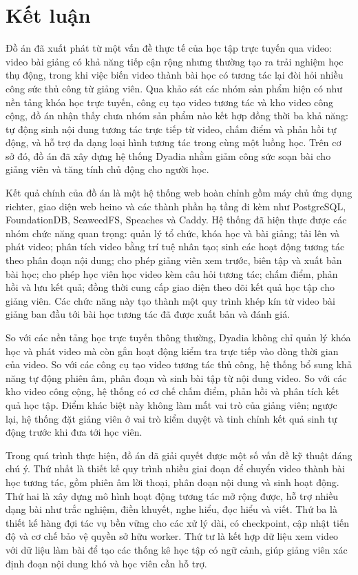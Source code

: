 \documentclass[../DoAn.tex]{subfiles}
\begin{document}
\section{Kết luận}
Đồ án đã xuất phát từ một vấn đề thực tế của học tập trực tuyến qua video: video bài giảng có khả năng tiếp cận rộng nhưng thường tạo ra trải nghiệm học thụ động, trong khi việc biến video thành bài học có tương tác lại đòi hỏi nhiều công sức thủ công từ giảng viên. Qua khảo sát các nhóm sản phẩm hiện có như nền tảng khóa học trực tuyến, công cụ tạo video tương tác và kho video công cộng, đồ án nhận thấy chưa nhóm sản phẩm nào kết hợp đồng thời ba khả năng: tự động sinh nội dung tương tác trực tiếp từ video, chấm điểm và phản hồi tự động, và hỗ trợ đa dạng loại hình tương tác trong cùng một luồng học. Trên cơ sở đó, đồ án đã xây dựng hệ thống Dyadia nhằm giảm công sức soạn bài cho giảng viên và tăng tính chủ động cho người học.

Kết quả chính của đồ án là một hệ thống web hoàn chỉnh gồm máy chủ ứng dụng richter, giao diện web heino và các thành phần hạ tầng đi kèm như PostgreSQL, FoundationDB, SeaweedFS, Speaches và Caddy. Hệ thống đã hiện thực được các nhóm chức năng quan trọng: quản lý tổ chức, khóa học và bài giảng; tải lên và phát video; phân tích video bằng trí tuệ nhân tạo; sinh các hoạt động tương tác theo phân đoạn nội dung; cho phép giảng viên xem trước, biên tập và xuất bản bài học; cho phép học viên học video kèm câu hỏi tương tác; chấm điểm, phản hồi và lưu kết quả; đồng thời cung cấp giao diện theo dõi kết quả học tập cho giảng viên. Các chức năng này tạo thành một quy trình khép kín từ video bài giảng ban đầu tới bài học tương tác đã được xuất bản và đánh giá.

So với các nền tảng học trực tuyến thông thường, Dyadia không chỉ quản lý khóa học và phát video mà còn gắn hoạt động kiểm tra trực tiếp vào dòng thời gian của video. So với các công cụ tạo video tương tác thủ công, hệ thống bổ sung khả năng tự động phiên âm, phân đoạn và sinh bài tập từ nội dung video. So với các kho video công cộng, hệ thống có cơ chế chấm điểm, phản hồi và phân tích kết quả học tập. Điểm khác biệt này không làm mất vai trò của giảng viên; ngược lại, hệ thống đặt giảng viên ở vai trò kiểm duyệt và tinh chỉnh kết quả sinh tự động trước khi đưa tới học viên.

Trong quá trình thực hiện, đồ án đã giải quyết được một số vấn đề kỹ thuật đáng chú ý. Thứ nhất là thiết kế quy trình nhiều giai đoạn để chuyển video thành bài học tương tác, gồm phiên âm lời thoại, phân đoạn nội dung và sinh hoạt động. Thứ hai là xây dựng mô hình hoạt động tương tác mở rộng được, hỗ trợ nhiều dạng bài như trắc nghiệm, điền khuyết, nghe hiểu, đọc hiểu và viết. Thứ ba là thiết kế hàng đợi tác vụ bền vững cho các xử lý dài, có checkpoint, cập nhật tiến độ và cơ chế bảo vệ quyền sở hữu worker. Thứ tư là kết hợp dữ liệu xem video với dữ liệu làm bài để tạo các thống kê học tập có ngữ cảnh, giúp giảng viên xác định đoạn nội dung khó và học viên cần hỗ trợ.
\end{document}

